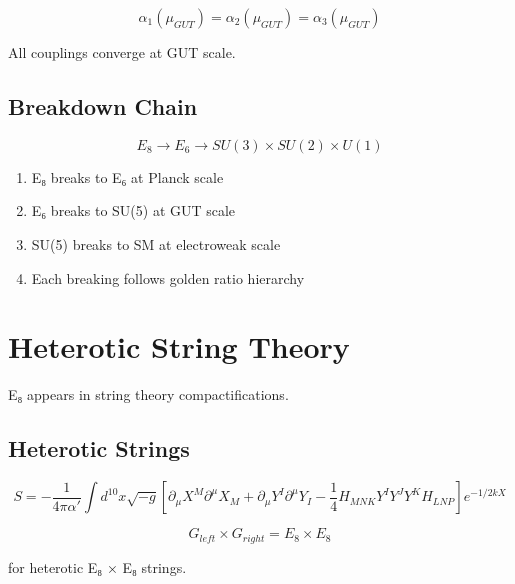 \begin{theorem}
\label{thm:gut-unification}
\begin{equation}
\alpha_1(\mu_{GUT}) = \alpha_2(\mu_{GUT}) = \alpha_3(\mu_{GUT})
\end{equation}

All couplings converge at GUT scale.
\end{theorem}

\subsection{Breakdown Chain}

\begin{equation}
E_8 \to E_6 \to SU(3) \times SU(2) \times U(1)
\end{equation}

\begin{proposition}
\label{prop:breaking-chain}
\begin{enumerate}
\item E₈ breaks to E₆ at Planck scale
\item E₆ breaks to SU(5) at GUT scale
\item SU(5) breaks to SM at electroweak scale
\item Each breaking follows golden ratio hierarchy
\end{enumerate}
\end{proposition}

\section{Heterotic String Theory}

E₈ appears in string theory compactifications.

\subsection{Heterotic Strings}

\begin{definition}
\label{def:heterotic}
\begin{equation}
S = -\frac{1}{4\pi\alpha'}\int d^{10}x \sqrt{-g}\left[\partial_\mu X^M\partial^\mu X_M + \partial_\mu Y^I\partial^\mu Y_I - \frac{1}{4}H_{MNK}Y^I Y^J Y^K H_{LNP}\right] e^{-1/2kX}
\end{equation}
\end{definition}

\begin{theorem}
\label{thm:heterotic-gauge}
\begin{equation}
G_{left} \times G_{right} = E_8 \times E_8
\end{equation}

for heterotic E₈ × E₈ strings.
\end{theorem}

